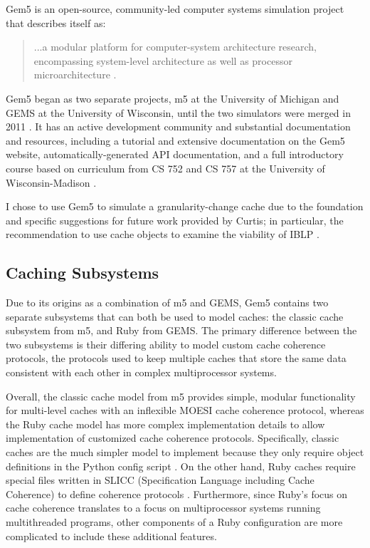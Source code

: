 \documentclass[12pt,twoside]{reedthesis}
\begin{document}
Gem5 is an open-source, community-led computer systems simulation project that describes itself as: \begin{quote}
	...a modular platform for computer-system architecture research, encompassing system-level architecture as well as processor microarchitecture \cite{gem5-about}.
\end{quote}

Gem5 began as two separate projects, m5 at the University of Michigan and GEMS at the University of Wisconsin, until the two simulators were merged in 2011 \cite{gem5-about}. It has an active development community and substantial documentation and resources, including a tutorial and extensive documentation on the Gem5 website, automatically-generated API documentation, and a full introductory course based on curriculum from CS 752 and CS 757 at the University of Wisconsin-Madison \cite{gem5-docs}.

I chose to use Gem5 to simulate a granularity-change cache due to the foundation and specific suggestions for future work provided by Curtis; in particular, the recommendation to use cache objects to examine the viability of IBLP \cite{curtis}.

	\subsection*{Caching Subsystems}

	Due to its origins as a combination of m5 and GEMS, Gem5 contains two separate subsystems that can both be used to model caches: the classic cache subsystem from m5, and Ruby from GEMS. The primary difference between the two subsystems is their differing ability to model custom cache coherence protocols, the protocols used to keep multiple caches that store the same data consistent with each other in complex multiprocessor systems.

	Overall, the classic cache model from m5 provides simple, modular functionality for multi-level caches with an inflexible MOESI cache coherence protocol, whereas the Ruby cache model has more complex implementation details to allow implementation of customized cache coherence protocols. Specifically, classic caches are the much simpler model to implement because they only require object definitions in the Python config script \cite{gem5-tutorial}. On the other hand, Ruby caches require special files written in SLICC (Specification Language including Cache Coherence) to define coherence protocols \cite{gem5-ruby}. Furthermore, since Ruby's focus on cache coherence translates to a focus on multiprocessor systems running multithreaded programs, other components of a Ruby configuration are more complicated to include these additional features.
\end{document}
